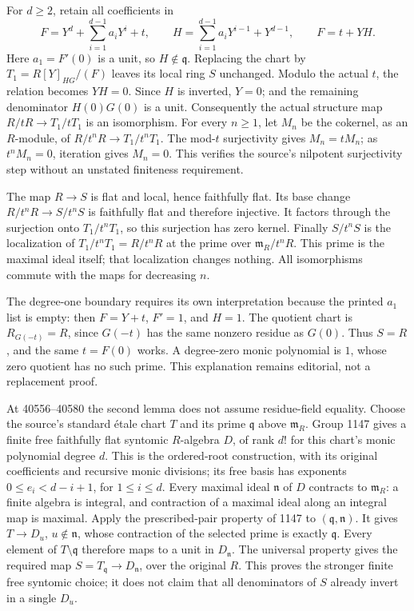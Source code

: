 For \(d\geq2\), retain all coefficients in \[
F=Y^d+\sum_{i=1}^{d-1}a_iY^i+t,\qquad
H=\sum_{i=1}^{d-1}a_iY^{i-1}+Y^{d-1},\qquad F=t+YH.
\] Here \(a_1=F'(0)\) is a unit, so \(H\notin\mathfrak q\). Replacing the chart by \(T_1=R[Y]_{HG}/(F)\) leaves its local ring \(S\) unchanged. Modulo the actual \(t\), the relation becomes \(YH=0\). Since \(H\) is inverted, \(Y=0\); and the remaining denominator \(H(0)G(0)\) is a unit. Consequently the actual structure map \(R/tR\to T_1/tT_1\) is an isomorphism. For every \(n\geq1\), let \(M_n\) be the cokernel, as an \(R\)-module, of \(R/t^nR\to T_1/t^nT_1\). The mod-\(t\) surjectivity gives \(M_n=tM_n\); as \(t^nM_n=0\), iteration gives \(M_n=0\). This verifies the source's nilpotent surjectivity step without an unstated finiteness requirement.

The map \(R\to S\) is flat and local, hence faithfully flat. Its base change \(R/t^nR\to S/t^nS\) is faithfully flat and therefore injective. It factors through the surjection onto \(T_1/t^nT_1\), so this surjection has zero kernel. Finally \(S/t^nS\) is the localization of \(T_1/t^nT_1=R/t^nR\) at the prime over \(\mathfrak m_R/t^nR\). This prime is the maximal ideal itself; that localization changes nothing. All isomorphisms commute with the maps for decreasing \(n\).

The degree-one boundary requires its own interpretation because the printed \(a_1\) list is empty: then \(F=Y+t\), \(F'=1\), and \(H=1\). The quotient chart is \(R_{G(-t)}=R\), since \(G(-t)\) has the same nonzero residue as \(G(0)\). Thus \(S=R\), and the same \(t=F(0)\) works. A degree-zero monic polynomial is \(1\), whose zero quotient has no such prime. This explanation remains editorial, not a replacement proof.

At 40556--40580 the second lemma does not assume residue-field equality. Choose the source's standard étale chart \(T\) and its prime \(\mathfrak q\) above \(\mathfrak m_R\). Group 1147 gives a finite free faithfully flat syntomic \(R\)-algebra \(D\), of rank \(d!\) for this chart's monic polynomial degree \(d\). This is the ordered-root construction, with its original coefficients and recursive monic divisions; its free basis has exponents \(0\leq e_i<d-i+1\), for \(1\leq i\leq d\). Every maximal ideal \(\mathfrak n\) of \(D\) contracts to \(\mathfrak m_R\): a finite algebra is integral, and contraction of a maximal ideal along an integral map is maximal. Apply the prescribed-pair property of 1147 to \((\mathfrak q,\mathfrak n)\). It gives \(T\to D_u\), \(u\notin\mathfrak n\), whose contraction of the selected prime is exactly \(\mathfrak q\). Every element of \(T\setminus\mathfrak q\) therefore maps to a unit in \(D_{\mathfrak n}\). The universal property gives the required map \(S=T_{\mathfrak q}\to D_{\mathfrak n}\), over the original \(R\). This proves the stronger finite free syntomic choice; it does not claim that all denominators of \(S\) already invert in a single \(D_u\).

